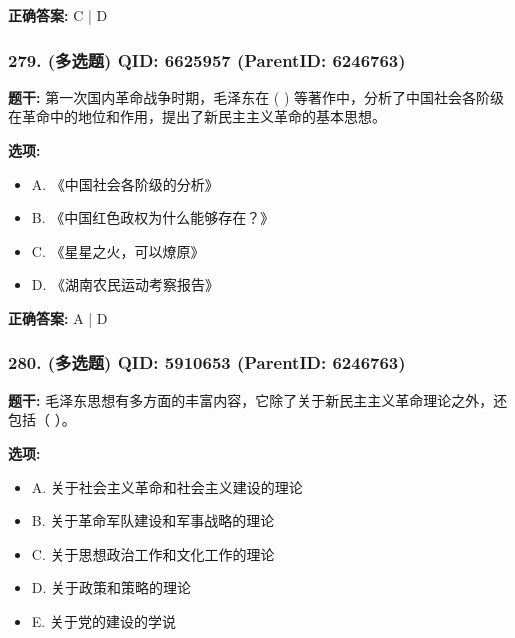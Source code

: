 \documentclass[12pt,UTF8]{ctexart}
\begin{document}
\textbf{正确答案:}
C | D

\vspace{0.3em}\hrulefill\vspace{0.7em}

\subsubsection*{279. (多选题) \small QID: 6625957 (ParentID: 6246763)}

\textbf{题干:}
第一次国内革命战争时期，毛泽东在 ( ) 等著作中，分析了中国社会各阶级在革命中的地位和作用，提出了新民主主义革命的基本思想。



\textbf{选项:}
\begin{itemize}[leftmargin=*]

  \item A. 《中国社会各阶级的分析》

  \item B. 《中国红色政权为什么能够存在？》

  \item C. 《星星之火，可以燎原》

  \item D. 《湖南农民运动考察报告》

\end{itemize}

\textbf{正确答案:}
A | D

\vspace{0.3em}\hrulefill\vspace{0.7em}

\subsubsection*{280. (多选题) \small QID: 5910653 (ParentID: 6246763)}

\textbf{题干:}
毛泽东思想有多方面的丰富内容，它除了关于新民主主义革命理论之外，还包括（ ）。



\textbf{选项:}
\begin{itemize}[leftmargin=*]

  \item A. 关于社会主义革命和社会主义建设的理论

  \item B. 关于革命军队建设和军事战略的理论

  \item C. 关于思想政治工作和文化工作的理论

  \item D. 关于政策和策略的理论

  \item E. 关于党的建设的学说

\end{itemize}
\end{document}
